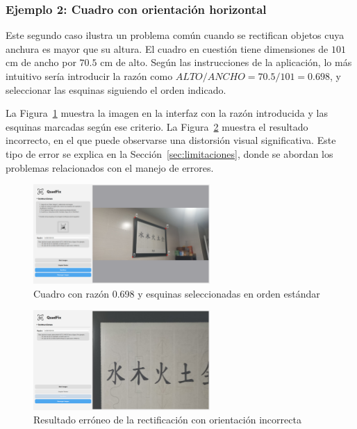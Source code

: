 \subsubsection*{Ejemplo 2: Cuadro con orientación horizontal}

Este segundo caso ilustra un problema común cuando se rectifican objetos cuya anchura es mayor que su altura. El cuadro en cuestión tiene dimensiones de $101$ cm de ancho por $70.5$ cm de alto. Según las instrucciones de la aplicación, lo más intuitivo sería introducir la razón como $ALTO/ANCHO = 70.5 / 101 = 0.698$, y seleccionar las esquinas siguiendo el orden indicado.

La Figura~\ref{fg:cuadro-invalido-1} muestra la imagen en la interfaz con la razón introducida y las esquinas marcadas según ese criterio. La Figura~\ref{fg:cuadro-invalido-2} muestra el resultado incorrecto, en el que puede observarse una distorsión visual significativa. Este tipo de error se explica en la Sección~\ref{sec:limitaciones}, donde se abordan los problemas relacionados con el manejo de errores.

\begin{figure}[H]
    \centering
    \includegraphics[width=0.6\textwidth]{figures/4.Examples/Especial/CuadroError1.png}
    \caption{Cuadro con razón 0.698 y esquinas seleccionadas en orden estándar}
    \label{fg:cuadro-invalido-1}
\end{figure}

\begin{figure}[H]
    \centering
    \includegraphics[width=0.6\textwidth]{figures/4.Examples/Especial/CuadroError2.png}
    \caption{Resultado erróneo de la rectificación con orientación incorrecta}
    \label{fg:cuadro-invalido-2}
\end{figure}

